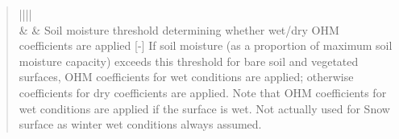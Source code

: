 \documentclass[letterpaper,10pt,english]{sphinxmanual}
\begin{document}
\begin{fulllineitems}
\begin{quote}
\begin{description}
\begin{savenotes}
\begin{longtable}{||||}
\\
\hline
{\hyperref[\detokenize{input_files/SUEWS_SiteInfo/SUEWS_Snow:suews-snow-txt}]{}}
&
{\hyperref[\detokenize{notation:term-md}]{}}
&
Soil moisture threshold determining whether wet/dry OHM coefficients are applied {[}-{]} If soil moisture (as a proportion of maximum soil moisture capacity) exceeds this threshold for bare soil and vegetated surfaces, OHM coefficients for wet conditions are applied; otherwise coefficients for dry coefficients are applied. Note that OHM coefficients for wet conditions are applied if the surface is wet. Not actually used for Snow surface as winter wet conditions always assumed.
\\
\hline
\end{longtable}\sphinxatlongtableend\end{savenotes}

\end{description}\end{quote}

\end{fulllineitems}

\end{document}
